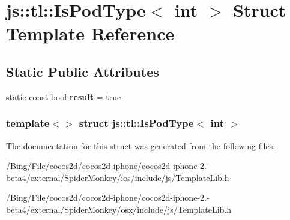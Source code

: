 \hypertarget{structjs_1_1tl_1_1_is_pod_type_3_01int_01_4}{\section{js\-:\-:tl\-:\-:Is\-Pod\-Type$<$ int $>$ Struct Template Reference}
\label{structjs_1_1tl_1_1_is_pod_type_3_01int_01_4}
}
\subsection*{Static Public Attributes}
\begin{DoxyCompactItemize}
\item 
\hypertarget{structjs_1_1tl_1_1_is_pod_type_3_01int_01_4_a98f1ebffccc9abb22ee33a73d77907a3}{static const bool {\bfseries result} = true}\label{structjs_1_1tl_1_1_is_pod_type_3_01int_01_4_a98f1ebffccc9abb22ee33a73d77907a3}

\end{DoxyCompactItemize}
\subsubsection*{template$<$$>$ struct js\-::tl\-::\-Is\-Pod\-Type$<$ int $>$}



The documentation for this struct was generated from the following files\-:\begin{DoxyCompactItemize}
\item 
/\-Bing/\-File/cocos2d/cocos2d-\/iphone/cocos2d-\/iphone-\/2.-\/beta4/external/\-Spider\-Monkey/ios/include/js/Template\-Lib.\-h\item 
/\-Bing/\-File/cocos2d/cocos2d-\/iphone/cocos2d-\/iphone-\/2.-\/beta4/external/\-Spider\-Monkey/osx/include/js/Template\-Lib.\-h\end{DoxyCompactItemize}
